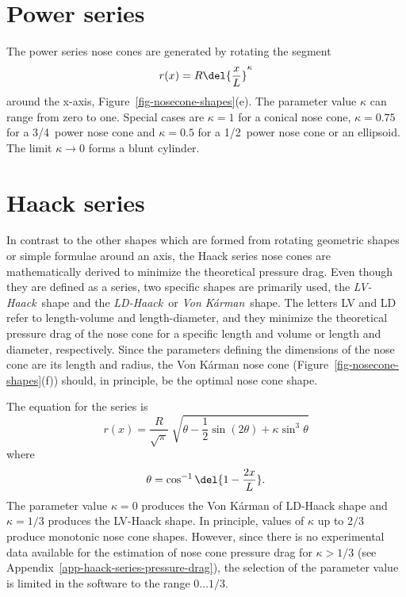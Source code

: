 \section{Power series}
\label{app-power-series}

The power series nose cones are generated by rotating the segment
%
\begin{equation}
r(x) = R\del{\frac{x}{L}}^\kappa
\end{equation}
%
around the x-axis, Figure~\ref{fig-nosecone-shapes}(e).  The parameter
value $\kappa$ can range from zero to one.  Special cases are
$\kappa=1$ for a conical nose cone, $\kappa=0.75$ for a 3/4~power nose
cone and $\kappa=0.5$ for a 1/2~power nose cone or an ellipsoid.
The limit $\kappa\rightarrow0$ forms a blunt cylinder.


\section{Haack series}

In contrast to the other shapes which are formed from rotating
geometric shapes or simple formulae around an axis, the Haack series
nose cones are mathematically derived to minimize the theoretical
pressure drag.  Even though they are defined as a series, two specific
shapes are primarily used, the {\it LV-Haack}\ shape and the 
{\it LD-Haack}\ or {\it Von Kárman}\ shape.  The letters LV and LD
refer to length-volume and length-diameter, and they minimize the
theoretical pressure drag of the nose cone for a specific length and
volume or length and diameter, respectively.  Since the parameters
defining the dimensions of the nose cone are its length and radius,
the Von Kárman nose cone (Figure~\ref{fig-nosecone-shapes}(f)) should,
in principle, be the optimal nose cone shape.

The equation for the series is
%
\begin{equation}
r(x) = \frac{R}{\sqrt{\pi}} \;
  \sqrt{\theta - \frac{1}{2}\sin(2\theta) + \kappa \sin^3\theta}
\end{equation}
%
where
%
\begin{equation}
\theta = \cos^{-1} \del{1-\frac{2x}{L}}.
\end{equation}
%
The parameter value $\kappa=0$ produces the Von Kárman of LD-Haack
shape and $\kappa=1/3$ produces the LV-Haack shape.  In principle,
values of $\kappa$ up to $2/3$ produce monotonic nose cone shapes.
However, since there is no experimental data available for the
estimation of nose cone pressure drag for $\kappa > 1/3$ (see
Appendix~\ref{app-haack-series-pressure-drag}), the selection of the
parameter value is limited in the software to the range 
$0 \ldots 1/3$.


